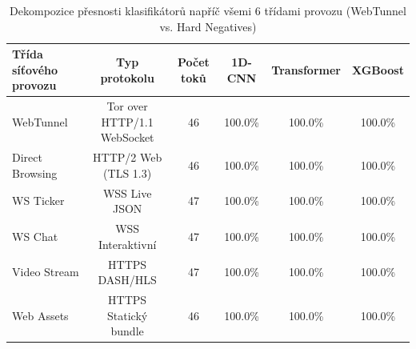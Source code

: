 \begin{table}[htbp]
\centering
\caption{Dekompozice přesnosti klasifikátorů napříč všemi 6 třídami provozu (WebTunnel vs. Hard Negatives)}
\label{tab:class_breakdown}
\begin{tabular}{lccccc}
\hline
\textbf{Třída síťového provozu} & \textbf{Typ protokolu} & \textbf{Počet toků} & \textbf{1D-CNN} & \textbf{Transformer} & \textbf{XGBoost} \\
\hline
WebTunnel & Tor over HTTP/1.1 WebSocket & 46 & 100.0\% & 100.0\% & 100.0\% \\
Direct Browsing & HTTP/2 Web (TLS 1.3) & 46 & 100.0\% & 100.0\% & 100.0\% \\
WS Ticker & WSS Live JSON & 47 & 100.0\% & 100.0\% & 100.0\% \\
WS Chat & WSS Interaktivní & 47 & 100.0\% & 100.0\% & 100.0\% \\
Video Stream & HTTPS DASH/HLS & 47 & 100.0\% & 100.0\% & 100.0\% \\
Web Assets & HTTPS Statický bundle & 46 & 100.0\% & 100.0\% & 100.0\% \\
\hline
\end{tabular}
\end{table}
